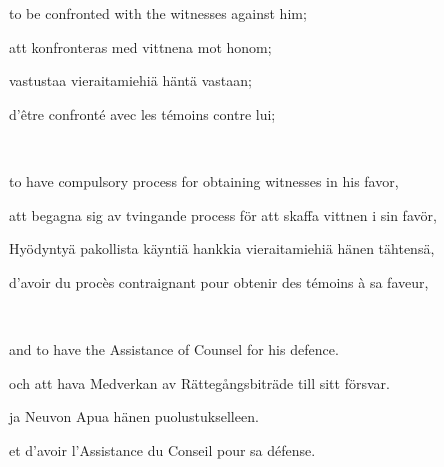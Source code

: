 \documentclass[a4paper,landscape,12pt]{article}
\begin{document}
\begin{minipage}[t]{0.22\textwidth}
to be confronted with the witnesses against him;
\end{minipage}\textwidth
\begin{minipage}[t]{0.22\textwidth}
att konfronteras med vittnena mot honom;	
\end{minipage}\textwidth
\begin{minipage}[t]{0.22\textwidth}
vastustaa vieraitamiehiä häntä vastaan;
\end{minipage}\textwidth
\begin{minipage}[t]{0.22\textwidth}
d'être confronté avec les témoins contre lui;
\end{minipage}

~

\begin{minipage}[t]{0.22\textwidth}
to have compulsory process for obtaining witnesses in his favor, 
\end{minipage}\textwidth
\begin{minipage}[t]{0.22\textwidth}
att begagna sig av tvingande process för att skaffa vittnen i sin favör,
\end{minipage}\textwidth
\begin{minipage}[t]{0.22\textwidth}
Hyödyntyä pakollista käyntiä hankkia vieraitamiehiä hänen tähtensä, 
\end{minipage}\textwidth
\begin{minipage}[t]{0.22\textwidth}
	d'avoir du procès contraignant pour obtenir des témoins à sa faveur,
\end{minipage}

~

\begin{minipage}[t]{0.22\textwidth}
and to have the Assistance of Counsel for his defence.
\end{minipage}\textwidth
\begin{minipage}[t]{0.22\textwidth}
och att hava Medverkan av Rättegångsbiträde till sitt försvar.
\end{minipage}\textwidth
\begin{minipage}[t]{0.22\textwidth}
ja Neuvon Apua hänen puolustukselleen.
\end{minipage}\textwidth
\begin{minipage}[t]{0.22\textwidth}
	et d'avoir l'Assistance du Conseil pour sa défense.
\end{minipage}
\end{document}
